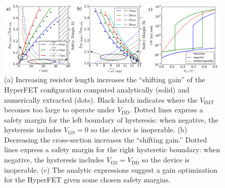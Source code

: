 \begin{figure}[!ht]
  \centering
  \vspace{-2em}
  \includegraphics[width=\textwidth]{images/Opt}
  \caption{(a) Increasing resistor length increases the ``shifting gain'' of the HyperFET configuration computed analytically (solid) and numerically extracted (dots). Black hatch indicates where the $V_\mathrm{IMT}$ becomes too large to operate under $V_\mathrm{DD}$.  Dotted lines express a safety margin for the left boundary of hysteresis: when negative, the hysteresis includes $V_\mathrm{GS}=0$ so the device is inoperable. (b) Decreasing the cross-section increases the ``shifting gain.'' Dotted lines express a safety margin for the right hysteretic boundary: when negative, the hysteresis includes $V_\mathrm{GS}=V_\mathrm{DD}$ so the device is inoperable. (c) The analytic expressions suggest a gain optimization for the HyperFET given some chosen safety margins.}
  \label{fig:Opt}
\end{figure}


